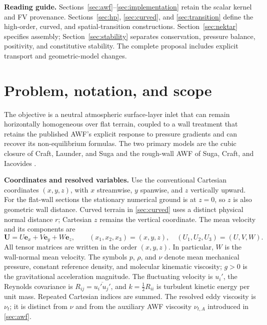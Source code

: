 \documentclass[11pt,a4paper]{article}
\numberwithin{equation}{section}
\newcommand{\nut}{\nu_t}
\newcommand{\avg}[1]{\overline{#1}}
\begin{document}
\textbf{Reading guide.} Sections~\ref{sec:awf}--\ref{sec:implementation}
retain the scalar kernel and FV provenance. Sections~\ref{sec:hp},
\ref{sec:curved}, and \ref{sec:transition} define the high-order,
curved, and spatial-transition constructions. Section~\ref{sec:nektar}
specifies assembly; Section~\ref{sec:stability} separates conservation,
pressure balance, positivity, and constitutive stability. The complete
proposal includes explicit transport and geometric-model changes.
\clearpage
\begingroup\small\setlength{\parskip}{0pt}\tableofcontents\endgroup
\clearpage

\section{Problem, notation, and scope}
\label{sec:scope}
The objective is a neutral atmospheric surface-layer inlet that can remain
horizontally homogeneous over flat terrain, coupled to a wall treatment that
retains the published AWF's explicit response to pressure gradients and can
recover its non-equilibrium formulas. The two primary models are the cubic
closure of Craft, Launder, and Suga \cite{CLS1996} and the rough-wall AWF of
Suga, Craft, and Iacovides \cite{SCI2006}.

\textbf{Coordinates and resolved variables.}
Use the conventional Cartesian coordinates $(x,y,z)$, with $x$ streamwise,
$y$ spanwise, and $z$ vertically upward. For the flat-wall sections the stationary numerical ground is
at $z=0$, so $z$ is also geometric wall distance. Curved terrain in
\cref{sec:curved} uses a distinct physical normal distance $r$;
Cartesian $z$ remains the vertical coordinate.
The mean velocity and its components are
\begin{equation}
 \bm U=U\bm e_x+V\bm e_y+W\bm e_z,
 \qquad (x_1,x_2,x_3)=(x,y,z),\quad (U_1,U_2,U_3)=(U,V,W).
 \label{eq:coordinates}
\end{equation}
All tensor matrices are written in the order $(x,y,z)$. In particular,
$W$ is the wall-normal mean velocity. The symbols $p$, $\rho$, and $\nu$
denote mean mechanical pressure, constant reference density, and molecular
kinematic viscosity; $g>0$ is the gravitational acceleration magnitude.
The fluctuating velocity is $u_i'$, the Reynolds covariance is
$R_{ij}=\avg{u_i'u_j'}$, and $k=\tfrac12R_{ii}$ is turbulent kinetic energy
per unit mass. Repeated Cartesian indices are summed. The resolved eddy
viscosity is $\nut$; it is distinct from $\nu$ and from the auxiliary AWF
viscosity $\nu_{t,A}$ introduced in \cref{sec:awf}.
\end{document}
